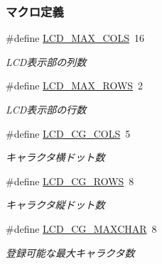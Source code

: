 \subsubsection*{マクロ定義}
\begin{DoxyCompactItemize}
\item 
\#define \hyperlink{lcd_8h_adae78cd0d04b19760d362972fe9b89ec_adae78cd0d04b19760d362972fe9b89ec}{L\+C\+D\+\_\+\+M\+A\+X\+\_\+\+C\+O\+L\+S}~16
\begin{DoxyCompactList}\small\item\em L\+C\+D表示部の列数 \end{DoxyCompactList}\item 
\#define \hyperlink{lcd_8h_a77ea70242c5ca6ad568f9857d2f19f5d_a77ea70242c5ca6ad568f9857d2f19f5d}{L\+C\+D\+\_\+\+M\+A\+X\+\_\+\+R\+O\+W\+S}~2
\begin{DoxyCompactList}\small\item\em L\+C\+D表示部の行数 \end{DoxyCompactList}\item 
\#define \hyperlink{lcd_8h_a5c9aa8fefb9889cd206088bffd11a775_a5c9aa8fefb9889cd206088bffd11a775}{L\+C\+D\+\_\+\+C\+G\+\_\+\+C\+O\+L\+S}~5
\begin{DoxyCompactList}\small\item\em キャラクタ横ドット数 \end{DoxyCompactList}\item 
\#define \hyperlink{lcd_8h_a5a12ffc5f6672964c86ad8a5aa29693d_a5a12ffc5f6672964c86ad8a5aa29693d}{L\+C\+D\+\_\+\+C\+G\+\_\+\+R\+O\+W\+S}~8
\begin{DoxyCompactList}\small\item\em キャラクタ縦ドット数 \end{DoxyCompactList}\item 
\#define \hyperlink{lcd_8h_a7420f2266a82b786e466b596afc165a5_a7420f2266a82b786e466b596afc165a5}{L\+C\+D\+\_\+\+C\+G\+\_\+\+M\+A\+X\+C\+H\+A\+R}~8
\begin{DoxyCompactList}\small\item\em 登録可能な最大キャラクタ数 \end{DoxyCompactList}\end{DoxyCompactItemize}
